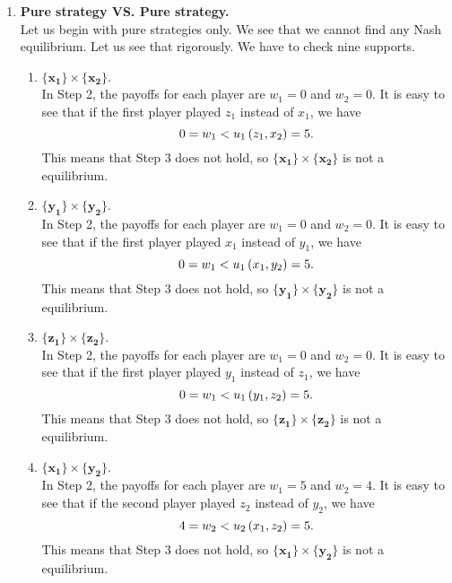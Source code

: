 \begin{enumerate} [label=\Alph*. ]
    \item \textbf{Pure strategy VS. Pure strategy.} \\
Let us begin with pure strategies only. We see that we cannot find any Nash equilibrium. Let us see that rigorously. We have to check nine supports.

\begin{enumerate} [label*= (\arabic*)]
	\item $\mathbf{\{x_1\}} \times \mathbf{\{x_2\}}$. \\
	      In Step 2, the payoffs for each player are $w_1 = 0$ and $w_2 = 0$. It is easy to see that if the first player played $z_1$ instead of $x_1$, we have
	      \begin{equation*}
	      	0 = w_1 < u_1 \left(z_1, x_2\right) = 5.
	      \end{equation*}
	      This means that Step 3 does not hold, so $\mathbf{\{x_1\}} \times \mathbf{\{x_2\}}$ is not a equilibrium.
	      
	\item $\mathbf{\{y_1\}} \times \mathbf{\{y_2\}}$. \\
	      In Step 2, the payoffs for each player are $w_1 = 0$ and $w_2 = 0$. It is easy to see that if the first player played $x_1$ instead of $y_1$, we have
	      \begin{equation*}
	      	0 = w_1 < u_1 \left(x_1, y_2\right) = 5.
	      \end{equation*}
	      This means that Step 3 does not hold, so $\mathbf{\{y_1\}} \times \mathbf{\{y_2\}}$ is not a equilibrium.
	      
	\item $\mathbf{\{z_1\}} \times \mathbf{\{z_2\}}$. \\
	      In Step 2, the payoffs for each player are $w_1 = 0$ and $w_2 = 0$. It is easy to see that if the first player played $y_1$ instead of $z_1$, we have
	      \begin{equation*}
	      	0 = w_1 < u_1 \left(y_1, z_2\right) = 5.
	      \end{equation*}
	      This means that Step 3 does not hold, so $\mathbf{\{z_1\}} \times \mathbf{\{z_2\}}$ is not a equilibrium.
	          
	          
	          
	\item $\mathbf{\{x_1\}} \times \mathbf{\{y_2\}}$. \\
	      In Step 2, the payoffs for each player are $w_1 = 5$ and $w_2 = 4$. It is easy to see that if the second player played $z_2$ instead of $y_2$, we have
	      \begin{equation*}
	      	4 = w_2 < u_2 \left(x_1, z_2\right) = 5.
	      \end{equation*}
	      This means that Step 3 does not hold, so $\mathbf{\{x_1\}} \times \mathbf{\{y_2\}}$ is not a equilibrium.
	          

\end{enumerate}
\end{enumerate}
